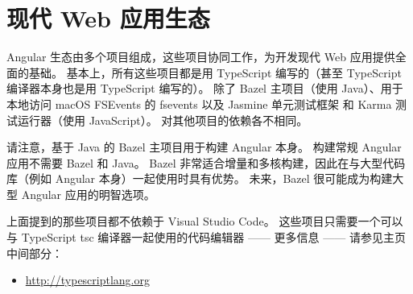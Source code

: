 \section{现代 Web 应用生态}


Angular 生态由多个项目组成，这些项目协同工作，为开发现代 Web 应用提供全面的基础。
基本上，所有这些项目都是用 TypeScript 编写的（甚至 TypeScript 编译器本身也是用 TypeScript 编写的）。
除了 Bazel 主项目（使用 Java）、用于本地访问 macOS FSEvents 的 fsevents 以及 Jasmine 单元测试框架
和 Karma 测试运行器（使用 JavaScript）。
对其他项目的依赖各不相同。


请注意，基于 Java 的 Bazel 主项目用于构建 Angular 本身。
构建常规 Angular 应用不需要 Bazel 和 Java。
Bazel 非常适合增量和多核构建，因此在与大型代码库（例如 Angular 本身）一起使用时具有优势。
未来，Bazel 很可能成为构建大型 Angular 应用的明智选项。


上面提到的那些项目都不依赖于 Visual Studio Code。
这些项目只需要一个可以与 TypeScript tsc 编译器一起使用的代码编辑器 —— 更多信息 —— 请参见主页中间部分：

\begin{itemize}
  \item \url{http://typescriptlang.org}
\end{itemize}

